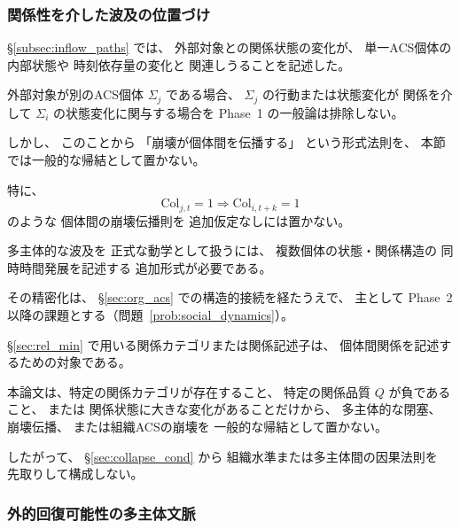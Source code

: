 \subsubsection{関係性を介した波及の位置づけ}

\begin{remark}[関係性を介した波及は可能性としてのみ接続する]
\label{rem:multi_agent_collapse_deferral}
\S\ref{subsec:inflow_paths} では、
外部対象との関係状態の変化が、
単一ACS個体の内部状態や
時刻依存量の変化と
関連しうることを記述した。

外部対象が別のACS個体
$\Sigma_j$
である場合、
$\Sigma_j$ の行動または状態変化が
関係を介して
$\Sigma_i$ の状態変化に関与する場合を
Phase~1 の一般論は排除しない。

しかし、
このことから
「崩壊が個体間を伝播する」
という形式法則を、
本節では一般的な帰結として置かない。

特に、
\[
  \mathrm{Col}_{j,t}=1
  \Longrightarrow
  \mathrm{Col}_{i,t+k}=1
\]
のような
個体間の崩壊伝播則を
追加仮定なしには置かない。

多主体的な波及を
正式な動学として扱うには、
複数個体の状態・関係構造の
同時時間発展を記述する
追加形式が必要である。

その精密化は、
\S\ref{sec:org_acs}
での構造的接続を経たうえで、
主として Phase~2 以降の課題とする（問題~\ref{prob:social_dynamics}）。
\end{remark}

\begin{remark}[関係カテゴリと多主体的崩壊の関係]
\label{rem:relation_category_collapse_scope}
\S\ref{sec:rel_min}
で用いる関係カテゴリまたは関係記述子は、
個体間関係を記述するための対象である。

本論文は、特定の関係カテゴリが存在すること、
特定の関係品質
$Q$
が負であること、
または
関係状態に大きな変化があることだけから、
多主体的な閉塞、
崩壊伝播、
または組織ACSの崩壊を
一般的な帰結として置かない。

したがって、
\S\ref{sec:collapse_cond} から
組織水準または多主体間の因果法則を
先取りして構成しない。
\end{remark}

\subsubsection{外的回復可能性の多主体文脈}

